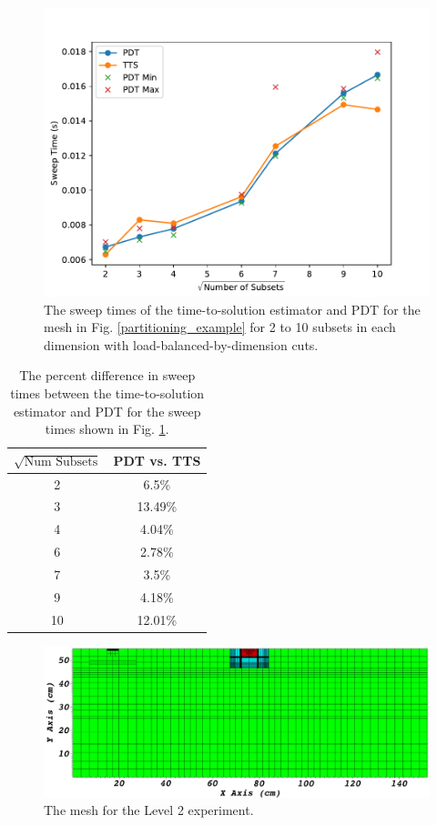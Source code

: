 \begin{figure}[ht]
  \centering
  \includegraphics[scale=0.75]{../../figures/spiderweb_lbd_pdtvtts.pdf}
  \caption{The sweep times of the time-to-solution estimator and PDT for the mesh in Fig. \ref{partitioning_example} for 2 to 10 subsets in each dimension with load-balanced-by-dimension cuts.}
\label{comp_lbd_spiderweb}
\end{figure}
\begin{table}[ht]
\centering
\caption{The percent difference in sweep times between the time-to-solution estimator and PDT for the sweep times shown in Fig. \ref{comp_lbd_spiderweb}.}
\label{diff_lbd_spiderweb}
\begin{tabular}{c|c}
\textbf{$\sqrt{\text{Num Subsets}}$} & \bf PDT vs. TTS \\ \hline 
2&6.5\%\\ \hline 
3&13.49\%\\ \hline 
4&4.04\%\\ \hline 
6&2.78\%\\ \hline 
7&3.5\%\\ \hline 
9&4.18\%\\ \hline 
10&12.01\%
\end{tabular}
\end{table}

\begin{figure}[ht]
\centering
\includegraphics[scale=0.3]{../../figures/level2_nocut.png}
\caption{The mesh for the Level 2 experiment.}
\label{level2_nocut}
\end{figure}

